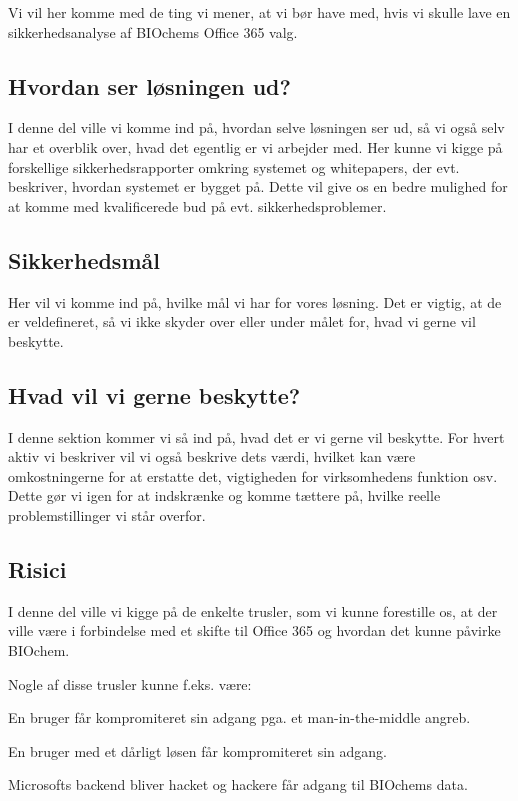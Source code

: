 \documentclass[10pt,a4paper,danish]{article}
\begin{document}
Vi vil her komme med de ting vi mener, at vi bør have med, hvis vi skulle lave
en sikkerhedsanalyse af BIOchems Office 365 valg.

\subsection{Hvordan ser løsningen ud?}
I denne del ville vi komme ind på, hvordan selve løsningen ser ud, så vi også
selv har et overblik over, hvad det egentlig er vi arbejder med.
Her kunne vi kigge på forskellige sikkerhedsrapporter omkring systemet og
whitepapers, der evt. beskriver, hvordan systemet er bygget på.
Dette vil give os en bedre mulighed for at komme med kvalificerede bud på
evt. sikkerhedsproblemer.

\subsection{Sikkerhedsmål}
Her vil vi komme ind på, hvilke mål vi har for vores løsning. Det er vigtig,
at de er veldefineret, så vi ikke skyder over eller under målet for, hvad
vi gerne vil beskytte.

\subsection{Hvad vil vi gerne beskytte?}
I denne sektion kommer vi så ind på, hvad det er vi gerne vil beskytte.
For hvert aktiv vi beskriver vil vi også beskrive dets værdi, hvilket
kan være omkostningerne for at erstatte det, vigtigheden for virksomhedens
funktion osv.
Dette gør vi igen for at indskrænke og komme tættere på, hvilke reelle
problemstillinger vi står overfor.

\subsection{Risici}
I denne del ville vi kigge på de enkelte trusler, som vi kunne forestille os,
at der ville være i forbindelse med et skifte til Office 365 og hvordan det
kunne påvirke BIOchem.

Nogle af disse trusler kunne f.eks. være:
\begin{description}
    \item En bruger får kompromiteret sin adgang pga. et man-in-the-middle angreb.
    \item En bruger med et dårligt løsen får kompromiteret sin adgang.
    \item Microsofts backend bliver hacket og hackere får adgang til BIOchems data.
\end{description}
\end{document}
